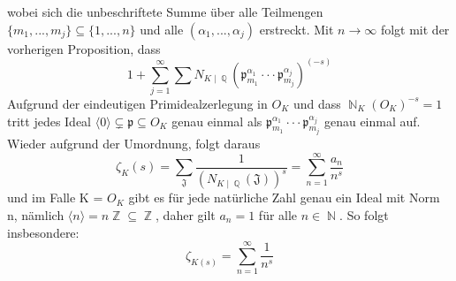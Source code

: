 \documentclass[10pt,a4paper]{article}
\DeclareMathOperator{\Q}{\mathbb{Q}}
\DeclareMathOperator{\Z}{\mathbb{Z}}
\DeclareMathOperator{\N}{\mathbb{N}}
\begin{document}
wobei sich die unbeschriftete Summe über alle Teilmengen $\{m_{1},...,m_{j}\}\subseteq \{ 1,...,n\}$ und alle $(\alpha_1,...,\alpha_j)$ erstreckt. Mit $n \rightarrow \infty$ folgt mit der vorherigen Proposition, dass $$1+\sum_{j=1}^{\infty}\sum N_{K\mid \Q}(\mathfrak{p}_{m_1}^{\alpha_1}\cdot\cdot\cdot\mathfrak{p}_{m_j}^{\alpha_j})^{(-s)}$$
Aufgrund der eindeutigen Primidealzerlegung in $O_K$ und dass $\N_K(O_K)^{-s}=1$ tritt jedes Ideal $\langle0\rangle\subsetneq \mathfrak{p} \subseteq O_{\textit{K}}$ genau einmal als $\mathfrak{p}_{m_1}^{\alpha_1}\cdot\cdot\cdot\mathfrak{p}_{m_j}^{\alpha_j}$ genau einmal auf. Wieder aufgrund der Umordnung, folgt daraus $$\zeta_{K}(s) = \sum_{\mathfrak{J}}\frac{1}{(N_{K\mid\Q}(\mathfrak{J}))^s}=\sum_{n=1}^{\infty}\frac{a_n}{n^s}$$ und im Falle K = $O_K$ gibt es für jede natürliche Zahl genau ein Ideal mit Norm n, nämlich $\langle n\rangle=n\Z\subseteq \Z$, daher gilt $a_n=1$ für alle $n\in \N$. So folgt insbesondere: $$\zeta_{K(s)}= \sum_{n=1}^{\infty}\frac{1}{n^s}$$
\end{document}
